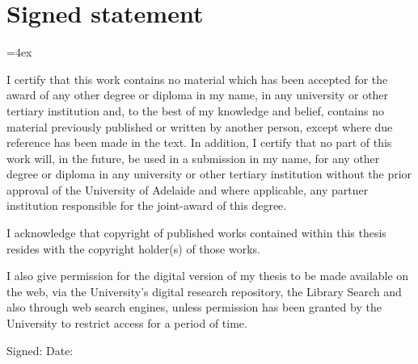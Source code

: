 \chapter{Signed statement}
{\parindent=0pt\parskip=4ex

%
%
%






%
%
I certify that this work contains no material which has been accepted for the award of any other degree or diploma in my name, in any university or other tertiary institution and, to the best of my knowledge and belief, contains no material previously published or written by another person, except where due reference has been made in the text. In addition, I certify that no part of this work will, in the future, be used in a submission in my name, for any other degree or diploma in any university or other tertiary institution without the prior approval of the University of Adelaide and where applicable, any partner institution responsible for the joint-award of this degree.

I acknowledge that copyright of published works contained within this thesis resides with the copyright holder(s) of those works.

I also give permission for the digital version of my thesis to be made available on the web, via the University’s digital research repository, the Library Search and also through web search engines, unless permission has been granted by the University to restrict access for a period of time.


Signed: \dotfill\quad 
Date: \dotfill

}

